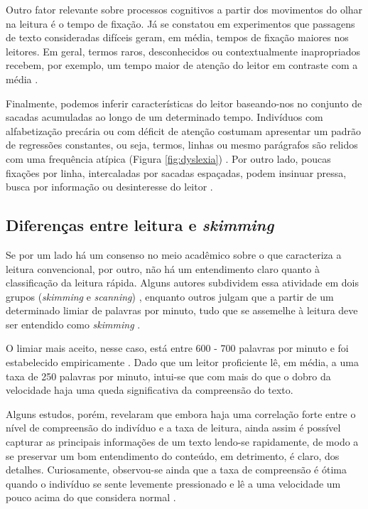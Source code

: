 \documentclass[12pt]{article}
\begin{document}
		Outro fator relevante sobre processos cognitivos a partir dos movimentos do olhar na leitura é o tempo de fixação. Já se constatou em experimentos que passagens de texto consideradas difíceis geram, em média, tempos de fixação maiores nos leitores. Em geral, termos raros, desconhecidos ou contextualmente inapropriados recebem, por exemplo, um tempo maior de atenção do leitor em contraste com a média \cite{Reichle-1998}.
		
		Finalmente, podemos inferir características do leitor baseando-nos no conjunto de sacadas acumuladas ao longo de um determinado tempo. Indivíduos com alfabetização precária ou com déficit de atenção costumam apresentar um padrão de regressões constantes, ou seja, termos, linhas ou mesmo parágrafos são relidos com uma frequência atípica (Figura \ref{fig:dyslexia}) \cite{Pavlidis-1981, Rayner-1998}. Por outro lado, poucas fixações por linha, intercaladas por sacadas espaçadas, podem insinuar pressa, busca por informação ou desinteresse do leitor \cite{Dyson-2001}.
			
		
		
		\subsection{Diferenças entre leitura e \textit{skimming}}
		Se por um lado há um consenso no meio acadêmico sobre o que caracteriza a leitura convencional, por outro, não há um entendimento claro quanto à classificação da leitura rápida. Alguns autores subdividem essa atividade em dois grupos (\textit{skimming} e \textit{scanning}) \cite{Campbell-2001}, enquanto outros julgam que a partir de um determinado limiar de palavras por minuto, tudo que se assemelhe à leitura deve ser entendido como \textit{skimming} \cite{Rayner-1998}.
		
		O limiar mais aceito, nesse caso, está entre 600 - 700 palavras por minuto e foi estabelecido empiricamente \cite{Rayner-1998}. Dado que um leitor proficiente lê, em média, a uma taxa de 250 palavras por minuto, intui-se que com mais do que o dobro da velocidade haja uma queda significativa da compreensão do texto.
		
		Alguns estudos, porém, revelaram que embora haja uma correlação forte entre o nível de compreensão do indivíduo e a taxa de leitura, ainda assim é possível capturar as principais informações de um texto lendo-se rapidamente, de modo a se preservar um bom entendimento do conteúdo, em detrimento, é claro, dos detalhes. Curiosamente, observou-se ainda que a taxa de compreensão é ótima quando o indivíduo se sente levemente pressionado e lê a uma velocidade um pouco acima do que considera normal \cite{Dyson-2001}. 
		
\end{document}
